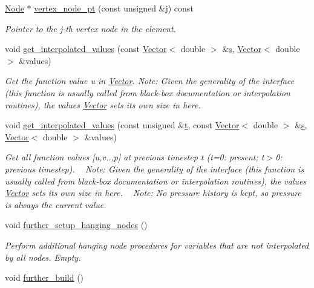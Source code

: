 \begin{DoxyCompactItemize}
\hyperlink{classoomph_1_1Node}{Node} $\ast$ \hyperlink{classoomph_1_1RefineableGeneralisedNewtonianAxisymmetricQCrouzeixRaviartElement_ab40a282339a7f9238f88de7f88654f15}{vertex\+\_\+node\+\_\+pt} (const unsigned \&j) const
\begin{DoxyCompactList}\small\item\em Pointer to the j-\/th vertex node in the element. \end{DoxyCompactList}\item 
void \hyperlink{classoomph_1_1RefineableGeneralisedNewtonianAxisymmetricQCrouzeixRaviartElement_abf7fec1b21d8301f2e62198f95a5e45d}{get\+\_\+interpolated\+\_\+values} (const \hyperlink{classoomph_1_1Vector}{Vector}$<$ double $>$ \&\hyperlink{cfortran_8h_ab7123126e4885ef647dd9c6e3807a21c}{s}, \hyperlink{classoomph_1_1Vector}{Vector}$<$ double $>$ \&values)
\begin{DoxyCompactList}\small\item\em Get the function value u in \hyperlink{classoomph_1_1Vector}{Vector}. Note\+: Given the generality of the interface (this function is usually called from black-\/box documentation or interpolation routines), the values \hyperlink{classoomph_1_1Vector}{Vector} sets its own size in here. \end{DoxyCompactList}\item 
void \hyperlink{classoomph_1_1RefineableGeneralisedNewtonianAxisymmetricQCrouzeixRaviartElement_a5b7210597de67dcdb363897539109464}{get\+\_\+interpolated\+\_\+values} (const unsigned \&\hyperlink{cfortran_8h_af6f0bd3dc13317f895c91323c25c2b8f}{t}, const \hyperlink{classoomph_1_1Vector}{Vector}$<$ double $>$ \&\hyperlink{cfortran_8h_ab7123126e4885ef647dd9c6e3807a21c}{s}, \hyperlink{classoomph_1_1Vector}{Vector}$<$ double $>$ \&values)
\begin{DoxyCompactList}\small\item\em Get all function values \mbox{[}u,v..,p\mbox{]} at previous timestep t (t=0\+: present; t$>$0\+: previous timestep). ~\newline
 Note\+: Given the generality of the interface (this function is usually called from black-\/box documentation or interpolation routines), the values \hyperlink{classoomph_1_1Vector}{Vector} sets its own size in here. ~\newline
Note\+: No pressure history is kept, so pressure is always the current value. \end{DoxyCompactList}\item 
void \hyperlink{classoomph_1_1RefineableGeneralisedNewtonianAxisymmetricQCrouzeixRaviartElement_abb293aeb834d1edf4d9f9e0150259e55}{further\+\_\+setup\+\_\+hanging\+\_\+nodes} ()
\begin{DoxyCompactList}\small\item\em Perform additional hanging node procedures for variables that are not interpolated by all nodes. Empty. \end{DoxyCompactList}\item 
void \hyperlink{classoomph_1_1RefineableGeneralisedNewtonianAxisymmetricQCrouzeixRaviartElement_a56b98748492bec100b08532892d5ac7f}{further\+\_\+build} ()
\end{DoxyCompactItemize}
